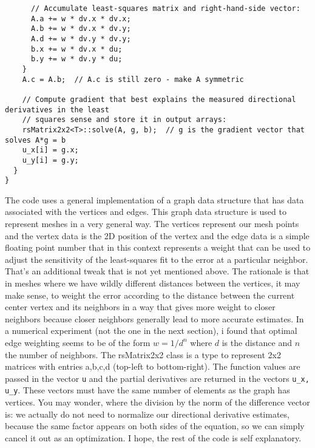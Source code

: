 \begin{lstlisting}
      // Accumulate least-squares matrix and right-hand-side vector:
      A.a += w * dv.x * dv.x;
      A.b += w * dv.x * dv.y;
      A.d += w * dv.y * dv.y;
      b.x += w * dv.x * du;
      b.y += w * dv.y * du;
    }
    A.c = A.b;  // A.c is still zero - make A symmetric

    // Compute gradient that best explains the measured directional derivatives in the least 
    // squares sense and store it in output arrays:
    rsMatrix2x2<T>::solve(A, g, b);  // g is the gradient vector that solves A*g = b
    u_x[i] = g.x;
    u_y[i] = g.y;
  }
}
\end{lstlisting}

The code uses a general implementation of a graph data structure that has data associated with the vertices and edges. This graph data structure is used to represent meshes in a very general way. The vertices represent our mesh points and the vertex data is the 2D position of the vertex and the edge data is a simple floating point number that in this context represents a weight that can be used to adjust the sensitivity of the least-squares fit to the error at a particular neighbor. That's an additional tweak that is not yet mentioned above. The rationale is that in meshes where we have wildly different distances between the vertices, it may make sense, to weight the error according to the distance between the current center vertex and its neighbors in a way that gives more weight to closer neighbors because closer neighbors generally lead to more accurate estimates. In a numerical experiment (not the one in the next section), i found that optimal edge weighting seems to be of the form $w = 1 / d^n$ where $d$ is the distance and $n$ the number of neighbors. The rsMatrix2x2 class is a type to represent 2x2 matrices with entries a,b,c,d (top-left to bottom-right). The function values are passed in the vector \texttt{u} and the partial derivatives are returned in the vectors  \texttt{u\_x, u\_y}. These vectors must have the same number of elements as the graph has vertices. You may wonder, where the division by the norm of the difference vector is: we actually do not need to normalize our directional derivative estimates, because the same factor appears on both sides of the equation, so we can simply cancel it out as an optimization. I hope, the rest of the code is self explanatory.


